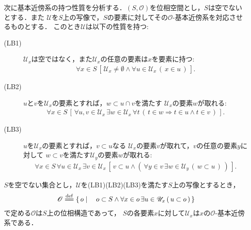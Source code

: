 	次に基本近傍系の持つ性質を分析する．$(S,\mathscr{O})$を位相空間とし，$S$は空でないとする．また
	$\mathscr{U}$を$S$上の写像で，$S$の要素に対してその$\mathscr{O}$-基本近傍系を対応させるものとする．
	このとき$\mathscr{U}$は以下の性質を持つ:
	\begin{description}
		\item[(LB1)] $\mathscr{U}_{x}$は空ではなく，また$\mathscr{U}_{x}$の任意の要素は$x$を要素に持つ:
			\begin{align}
				\forall x \in S\, \left[\, \mathscr{U}_{x} \neq \emptyset 
				\wedge \forall u \in \mathscr{U}_{x}\, (\, x \in u\, )\, \right].
			\end{align}

		\item[(LB2)] $u$と$v$を$\mathscr{U}_{x}$の要素とすれば，$w \subset u \cap v$を満たす
			$\mathscr{U}_{x}$の要素$w$が取れる:
			\begin{align}
				\forall x \in S\, 
				\left[\, \forall u,v \in \mathscr{U}_{x}\, \exists w \in \mathscr{U}_{x}\,
				\forall t\, \left(\, t \in w \Longrightarrow t \in u \wedge t \in v\, \right)\, \right].
			\end{align}
			
		\item[(LB3)] $u$を$\mathscr{U}_{x}$の要素とすれば，$v \subset u$なる
			$\mathscr{U}_{x}$の要素$v$が取れて，$v$の任意の要素$y$に対して
			$w \subset v$を満たす$\mathscr{U}_{y}$の要素$w$が取れる:
			\begin{align}
				\forall x \in S\, \forall u \in \mathscr{U}_{x}\, \exists v \in \mathscr{U}_{x}\,
				\left[\, v \subset u \wedge \left(\, \forall y \in v\,
				\exists w \in \mathscr{U}_{y}\, (\, w \subset u\, )\, \right)\, \right].
			\end{align}
	\end{description}
	
	\begin{screen}
		\begin{thm}[与えられたシステムを基本近傍系とする位相の生成]
		\label{thm:a_local_base_restores_the_topology}
			$S$を空でない集合とし，$\mathscr{U}$を(LB1)(LB2)(LB3)を満たす$S$上の写像とするとき，
			\begin{align}
				\mathscr{O} \defeq
				\Set{o}{o \subset S \wedge \forall x \in o\, \exists u \in \mathscr{U}_{x}\, (\, u \subset o\, )}
			\end{align}
			で定める$\mathscr{O}$は$S$上の位相構造であって，
			$S$の各要素$x$に対して$\mathscr{U}_{x}$は$x$の$\mathscr{O}$-基本近傍系である．
		\end{thm}
	\end{screen}
	
